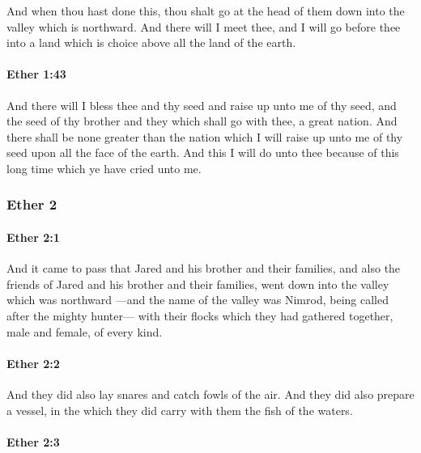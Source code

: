 			And when thou hast done this,
			thou shalt go at the head of them down into the valley which is northward.
			And there will I meet thee,
			and I will go before thee into a land
			which is choice above all the land of the earth.

		\paragraph{Ether 1:43} %
			\label{ETHER-1-43}

			And there will I bless thee and thy seed
			and raise up unto me of thy seed,
			and the seed of thy brother and they which shall go with thee,
			a great nation.
			And there shall be none greater than the nation
			which I will raise up unto me of thy seed
			upon all the face of the earth.
			And this I will do unto thee
			because of this long time which ye have cried unto me.

	\subsubsection{Ether 2} %
		\label{ETHER-2}
		
		\paragraph{Ether 2:1} %
			\label{ETHER-2-1}

			And it came to pass that Jared and his brother and their families,
			and also the friends of Jared and his brother and their families,
			went down into the valley which was northward
			---and the name of the valley was Nimrod,
			being called after the mighty hunter---
			with their flocks which they had gathered together,
			male and female, of every kind.

		\paragraph{Ether 2:2} %
			\label{ETHER-2-2}

			And they did also lay snares and catch fowls of the air.
			And they did also prepare a vessel,
			in the which they did carry with them the fish of the waters.

		\paragraph{Ether 2:3} %
			\label{ETHER-2-3}

